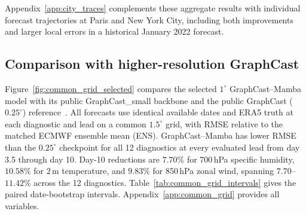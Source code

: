 \documentclass{article}
\newcommand{\vfourchange}[1]{{\color{blue}#1}}
\newcommand{\vfourred}[1]{{\color{red}#1}}
\newif\ifvfivechanges
\newcommand{\vfiveidentity}[1]{#1}
\DeclareRobustCommand{\vfiveadded}[1]{\ifvfivechanges{\color{vfiveAdded}%
  \let\vfourchange\vfiveidentity\let\vfourred\vfiveidentity#1}\else{\color{blue}%
  \let\vfourchange\vfiveidentity\let\vfourred\vfiveidentity#1}\fi}
\begin{document}
Appendix~\ref{app:city_traces} complements these aggregate results with individual forecast trajectories at Paris and New York City, including both improvements and larger local errors\vfourchange{ in a historical January 2022 forecast}.

\subsection{\texorpdfstring{{Comparison with higher-resolution GraphCast}}{Comparison with higher-resolution GraphCast}}
\label{sec:common_grid}
\ifvfivechanges
\par\begingroup\color{vfiveDeleted}\noindent
\sout{Figure~\mbox{\ref{fig:common_grid_selected}} compares the selected $1^\circ$ GraphCast--Mamba model with its frozen GraphCast\_small backbone and the public GraphCast ($0.25^\circ$) reference~\mbox{\citep{lam2023graphcast}} for specific humidity at 700\,hPa, $2$\,m temperature, and zonal wind at 850\,hPa. All forecasts are verified on a common $1.5^\circ$ grid. Forecasts are initialized throughout 2023 and verified against identical ERA5 fields, with RMSE expressed relative to the matched ECMWF ensemble mean (ENS). At each diagnostic and lead, every predictor uses the same available dates. GraphCast--Mamba has lower RMSE than the $0.25^\circ$ checkpoint for all 12 diagnostics at every evaluated lead from day 3.5 through day 10. At day 10, reductions are $7.70\%$ for 700\,hPa specific humidity, $10.58\%$ for $2$\,m temperature, and $9.83\%$ for 850\,hPa zonal wind, spanning $7.70$--$11.42\%$ across the 12 diagnostics. Paired day-10 date-bootstrap intervals for these three reductions are $[6.93,8.45]\%$, $[8.82,11.55]\%$, and $[8.67,10.80]\%$, respectively (Table~\mbox{\ref{tab:common_grid_intervals}}). This comparison shows that the learned correction can improve skill at longer forecast lead times even relative to a model with finer output resolution. Appendix~\mbox{\ref{app:common_grid}} provides the complete set of variables.}
\par\endgroup
\fi
\vfiveadded{Figure~\ref{fig:common_grid_selected} compares the \vfourchange{selected $1^\circ$} GraphCast--Mamba model with its \vfourchange{public GraphCast\_small} backbone and the \vfourchange{public} GraphCast ($0.25^\circ$) reference~\citep{lam2023graphcast}. All forecasts use identical available dates and ERA5 truth at each diagnostic and lead on a common $1.5^\circ$ grid, with RMSE relative to the matched ECMWF ensemble mean (ENS). \vfourchange{GraphCast--Mamba has lower RMSE than the $0.25^\circ$ checkpoint for all 12 diagnostics at every evaluated lead from day 3.5 through day 10. Day-10 reductions are $7.70\%$ for 700\,hPa specific humidity, $10.58\%$ for $2$\,m temperature, and $9.83\%$ for 850\,hPa zonal wind, spanning $7.70$--$11.42\%$ across the 12 diagnostics. Table~\ref{tab:common_grid_intervals} gives the paired date-bootstrap intervals.} Appendix~\ref{app:common_grid} provides all variables.}
\end{document}
